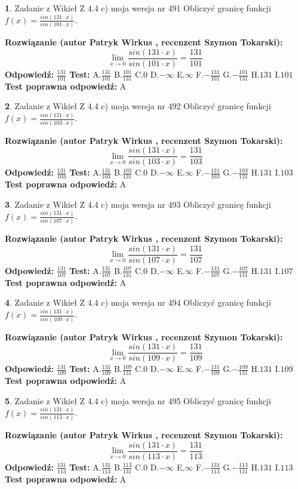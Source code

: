 \documentclass[12pt, a4paper]{article}
\theoremstyle{definition} %
\newtheorem{zad}{}
\newcommand{\zadStart}[1]{\begin{zad}#1\newline}
\newcommand{\zadStop}{\end{zad}}
\newcommand{\rozwStart}[2]{\noindent \textbf{Rozwiązanie (autor #1 , recenzent #2): }\newline}
\newcommand{\rozwStop}{\newline}
\newcommand{\odpStart}{\noindent \textbf{Odpowiedź:}\newline}
\newcommand{\odpStop}{\newline}
\newcommand{\testStart}{\noindent \textbf{Test:}\newline}
\newcommand{\testStop}{\newline}
\newcommand{\kluczStart}{\noindent \textbf{Test poprawna odpowiedź:}\newline}
\newcommand{\kluczStop}{\newline}
\begin{document}
\zadStart{Zadanie z Wikieł Z 4.4 c) moja wersja nr 491}
Obliczyć granicę funkcji $f(x)=\frac{sin(131\cdot x)}{sin(101\cdot x)}$.
\zadStop
\rozwStart{Patryk Wirkus}{Szymon Tokarski}
$$\lim\limits_{x\to 0}\frac{sin(131\cdot x)}{sin(101\cdot x)}=
\frac{131}{101}$$
\rozwStop
\odpStart
$\frac{131}{101}$
\odpStop
\testStart
A.$\frac{131}{101}$
B.$\frac{101}{131}$
C.$0$
D.$-\infty$
E.$\infty$
F.$-\frac{131}{101}$
G.$-\frac{101}{131}$
H.$131$
I.$101$
\testStop
\kluczStart
A
\kluczStop



\zadStart{Zadanie z Wikieł Z 4.4 c) moja wersja nr 492}
Obliczyć granicę funkcji $f(x)=\frac{sin(131\cdot x)}{sin(103\cdot x)}$.
\zadStop
\rozwStart{Patryk Wirkus}{Szymon Tokarski}
$$\lim\limits_{x\to 0}\frac{sin(131\cdot x)}{sin(103\cdot x)}=
\frac{131}{103}$$
\rozwStop
\odpStart
$\frac{131}{103}$
\odpStop
\testStart
A.$\frac{131}{103}$
B.$\frac{103}{131}$
C.$0$
D.$-\infty$
E.$\infty$
F.$-\frac{131}{103}$
G.$-\frac{103}{131}$
H.$131$
I.$103$
\testStop
\kluczStart
A
\kluczStop



\zadStart{Zadanie z Wikieł Z 4.4 c) moja wersja nr 493}
Obliczyć granicę funkcji $f(x)=\frac{sin(131\cdot x)}{sin(107\cdot x)}$.
\zadStop
\rozwStart{Patryk Wirkus}{Szymon Tokarski}
$$\lim\limits_{x\to 0}\frac{sin(131\cdot x)}{sin(107\cdot x)}=
\frac{131}{107}$$
\rozwStop
\odpStart
$\frac{131}{107}$
\odpStop
\testStart
A.$\frac{131}{107}$
B.$\frac{107}{131}$
C.$0$
D.$-\infty$
E.$\infty$
F.$-\frac{131}{107}$
G.$-\frac{107}{131}$
H.$131$
I.$107$
\testStop
\kluczStart
A
\kluczStop



\zadStart{Zadanie z Wikieł Z 4.4 c) moja wersja nr 494}
Obliczyć granicę funkcji $f(x)=\frac{sin(131\cdot x)}{sin(109\cdot x)}$.
\zadStop
\rozwStart{Patryk Wirkus}{Szymon Tokarski}
$$\lim\limits_{x\to 0}\frac{sin(131\cdot x)}{sin(109\cdot x)}=
\frac{131}{109}$$
\rozwStop
\odpStart
$\frac{131}{109}$
\odpStop
\testStart
A.$\frac{131}{109}$
B.$\frac{109}{131}$
C.$0$
D.$-\infty$
E.$\infty$
F.$-\frac{131}{109}$
G.$-\frac{109}{131}$
H.$131$
I.$109$
\testStop
\kluczStart
A
\kluczStop



\zadStart{Zadanie z Wikieł Z 4.4 c) moja wersja nr 495}
Obliczyć granicę funkcji $f(x)=\frac{sin(131\cdot x)}{sin(113\cdot x)}$.
\zadStop
\rozwStart{Patryk Wirkus}{Szymon Tokarski}
$$\lim\limits_{x\to 0}\frac{sin(131\cdot x)}{sin(113\cdot x)}=
\frac{131}{113}$$
\rozwStop
\odpStart
$\frac{131}{113}$
\odpStop
\testStart
A.$\frac{131}{113}$
B.$\frac{113}{131}$
C.$0$
D.$-\infty$
E.$\infty$
F.$-\frac{131}{113}$
G.$-\frac{113}{131}$
H.$131$
I.$113$
\testStop
\kluczStart
A
\kluczStop
\end{document}
